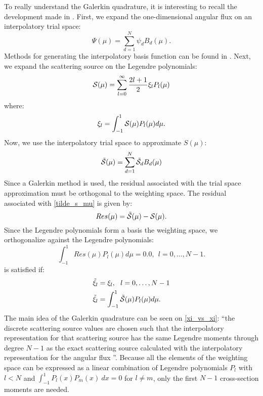 To really understand the Galerkin quadrature, it is interesting to recall 
the development made in \cite{galerkin_morel}. First, we expand the
one-dimensional angular flux on an interpolatory trial space:
\begin{equation}
\Psi(\mu) = \sum_{d=1}^N \psi_d B_d(\mu).
\label{psi_b}
\end{equation}
Methods for generating the interpolatory basis function can be found in 
\cite{galerkin_morel}. Next, we expand the scattering source on the Legendre
polynomials:
\begin{equation}
\mc{S}(\mu) = \sum_{l=0}^{\infty} \frac{2l+1}{2} \xi_l P_l(\mu)
\label{S_mu_2}
\end{equation}
where:
\begin{equation}
  \xi_l = \int_{-1}^1 \mathcal{S}(\mu) P_l(\mu) d\mu.
\end{equation}
Now, we use the interpolatory trial space to approximate $S(\mu)$:
\begin{equation}
\tilde{\mc{S}}(\mu) = \sum_{d=1}^N \tilde{\mc{S}}_d B_d(\mu)
\label{tilde_s_mu}
\end{equation}
Since a Galerkin method is used, the residual associated with the trial space 
approximation must be orthogonal to the weighting
space. The residual associated with \cref{tilde_s_mu} is given by:
\begin{equation}
Res(\mu) = \tilde{\mc{S}}(\mu) - \mc{S}(\mu).
\label{R_mu}
\end{equation}
Since the Legendre polynomials form a basis the weighting space, we
orthogonalize against the Legendre polynomials:
\begin{equation}
\int_{-1}^1 Res(\mu) P_l(\mu) d\mu = 0.0,\ \ l=0,\hdots,N-1.
\label{int_r_mu}
\end{equation}
 is satisfied if:
\begin{align}
&\tilde{\xi}_l = \xi_l,\ \ l=0,\hdots,N-1 \label{xi_vs_xi}\\
&\tilde{\xi}_l = \int_{-1}^1 \tilde{\mc{S}}(\mu) P_l(\mu) d\mu.
\end{align}
The main idea of the Galerkin quadrature can be seen on \cref{xi_vs_xi}: ``the
discrete scattering source values are chosen such that the interpolatory
representation for that scattering source has the same Legendre moments
through degree $N-1$ as the exact scattering source calculated with the
interpolatory representation for the angular flux \cite{galerkin_morel}''. 
Because all the elements of the weighting space can be expressed as a linear
combination of Legendre polynomials $P_l$ with $l<N$ and $\int_{-1}^{1}
P_l(x)P_m(x)\ dx=0$ for $l\neq m$, only the first $N-1$ cross-section moments
are needed.

